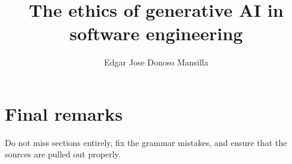 \documentclass[sigconf, 12pt]{acmart}
\title[CS205 Paper 3]{The ethics of generative AI in software engineering}
\author{Edgar Jose Donoso Mansilla}
\affiliation{
	\institution{DigiPen Institute of Technology}
	\country{USA}
}
\begin{document}


\maketitle







\section{Final remarks}
Do not miss sections entirely, fix the grammar mistakes, and ensure that the sources are pulled out properly.

\onecolumn



\end{document}
